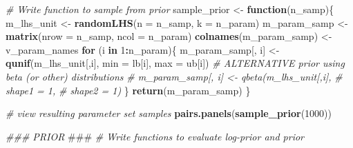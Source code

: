 \documentclass[
]{article}
\newenvironment{Shaded}{\begin{snugshade}}{\end{snugshade}}
\newcommand{\AlertTok}[1]{\textcolor[rgb]{0.94,0.16,0.16}{#1}}
\newcommand{\CommentTok}[1]{\textcolor[rgb]{0.56,0.35,0.01}{\textit{#1}}}
\newcommand{\ControlFlowTok}[1]{\textcolor[rgb]{0.13,0.29,0.53}{\textbf{#1}}}
\newcommand{\DataTypeTok}[1]{\textcolor[rgb]{0.13,0.29,0.53}{#1}}
\newcommand{\DecValTok}[1]{\textcolor[rgb]{0.00,0.00,0.81}{#1}}
\newcommand{\KeywordTok}[1]{\textcolor[rgb]{0.13,0.29,0.53}{\textbf{#1}}}
\newcommand{\NormalTok}[1]{#1}
\newcommand{\OperatorTok}[1]{\textcolor[rgb]{0.81,0.36,0.00}{\textbf{#1}}}
\newcommand{\StringTok}[1]{\textcolor[rgb]{0.31,0.60,0.02}{#1}}
\begin{document}
\begin{Shaded}
\begin{Highlighting}[]
\CommentTok{#  Write function to sample from prior}
\NormalTok{sample_prior <-}\StringTok{ }\ControlFlowTok{function}\NormalTok{(n_samp)\{}
\NormalTok{  m_lhs_unit   <-}\StringTok{ }\KeywordTok{randomLHS}\NormalTok{(}\DataTypeTok{n =}\NormalTok{ n_samp, }\DataTypeTok{k =}\NormalTok{ n_param)}
\NormalTok{  m_param_samp <-}\StringTok{ }\KeywordTok{matrix}\NormalTok{(}\DataTypeTok{nrow =}\NormalTok{ n_samp, }\DataTypeTok{ncol =}\NormalTok{ n_param)}
  \KeywordTok{colnames}\NormalTok{(m_param_samp) <-}\StringTok{ }\NormalTok{v_param_names}
  \ControlFlowTok{for}\NormalTok{ (i }\ControlFlowTok{in} \DecValTok{1}\OperatorTok{:}\NormalTok{n_param)\{}
\NormalTok{    m_param_samp[, i] <-}\StringTok{ }\KeywordTok{qunif}\NormalTok{(m_lhs_unit[,i],}
                               \DataTypeTok{min =}\NormalTok{ lb[i],}
                               \DataTypeTok{max =}\NormalTok{ ub[i])}
    \CommentTok{# ALTERNATIVE prior using beta (or other) distributions}
    \CommentTok{# m_param_samp[, i] <- qbeta(m_lhs_unit[,i],}
    \CommentTok{#                            shape1 = 1,}
    \CommentTok{#                            shape2 = 1)}
\NormalTok{  \}}
  \KeywordTok{return}\NormalTok{(m_param_samp)}
\NormalTok{\}}

\CommentTok{# view resulting parameter set samples}
\KeywordTok{pairs.panels}\NormalTok{(}\KeywordTok{sample_prior}\NormalTok{(}\DecValTok{1000}\NormalTok{))}


\CommentTok{###  PRIOR  }\AlertTok{###}\CommentTok{ }
\CommentTok{# Write functions to evaluate log-prior and prior}


\end{Highlighting}
\end{Shaded}
\end{document}
